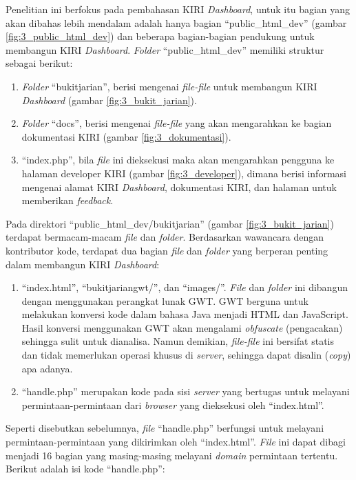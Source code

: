 Penelitian ini berfokus pada pembahasan KIRI \textit{Dashboard}, untuk itu bagian yang akan dibahas lebih mendalam adalah hanya bagian ``public\_html\_dev'' (gambar \ref{fig:3_public_html_dev}) dan beberapa bagian-bagian pendukung untuk membangun KIRI \textit{Dashboard}. \textit{Folder} ``public\_html\_dev'' memiliki struktur sebagai berikut:
\begin{enumerate}
	\item \textit{Folder} ``bukitjarian'', berisi mengenai \textit{file-file} untuk membangun KIRI \textit{Dashboard} (gambar \ref{fig:3_bukit_jarian}).
	\item \textit{Folder} ``docs'', berisi mengenai \textit{file-file} yang akan mengarahkan ke bagian dokumentasi KIRI (gambar \ref{fig:3_dokumentasi}).
	\item ``index.php'', bila \textit{file} ini dieksekusi maka akan mengarahkan pengguna ke halaman developer KIRI (gambar \ref{fig:3_developer}), dimana berisi informasi mengenai alamat KIRI \textit{Dashboard}, dokumentasi KIRI, dan halaman untuk memberikan \textit{feedback}.
\end{enumerate}

Pada direktori ``public\_html\_dev/bukitjarian'' (gambar \ref{fig:3_bukit_jarian}) terdapat bermacam-macam \textit{file} dan \textit{folder}. Berdasarkan wawancara dengan kontributor kode, terdapat dua bagian \textit{file} dan \textit{folder} yang berperan penting dalam membangun KIRI \textit{Dashboard}:
\begin{enumerate}
	\item ``index.html'', ``bukitjariangwt/'', dan ``images/''. \textit{File} dan \textit{folder} ini dibangun dengan menggunakan perangkat lunak GWT. GWT berguna untuk melakukan konversi kode dalam bahasa Java menjadi HTML dan JavaScript. Hasil konversi menggunakan GWT akan mengalami \textit{obfuscate} (pengacakan) sehingga sulit untuk dianalisa. Namun demikian, \textit{file-file} ini bersifat statis dan tidak memerlukan operasi khusus di \textit{server}, sehingga dapat disalin (\textit{copy}) apa adanya. 
	\item ``handle.php'' merupakan kode pada sisi \textit{server} yang bertugas untuk melayani permintaan-permintaan dari \textit{browser} yang dieksekusi oleh ``index.html''.
\end{enumerate}

Seperti disebutkan sebelumnya, \textit{file} ``handle.php'' berfungsi untuk melayani permintaan-permintaan yang dikirimkan oleh ``index.html''. \textit{File} ini dapat dibagi menjadi 16 bagian yang masing-masing melayani \textit{domain} permintaan tertentu. Berikut adalah isi kode ``handle.php'':

